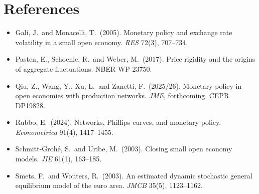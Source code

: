 \documentclass[11pt,a4paper]{article}
\begin{document}
\section*{References}

\begin{itemize}\setlength\itemsep{2pt}
\item[\small\textbullet] Gal\'i, J.\ and Monacelli, T.\ (2005). Monetary policy and exchange rate
  volatility in a small open economy. \textit{RES} 72(3), 707--734. 
\item[\small\textbullet] Pasten, E., Schoenle, R.\ and Weber, M.\ (2017). Price rigidity and the
  origins of aggregate fluctuations. NBER WP 23750. 
\item[\small\textbullet] Qiu, Z., Wang, Y., Xu, L.\ and Zanetti, F.\ (2025/26). Monetary policy in
  open economies with production networks. \textit{JME}, forthcoming. CEPR DP19828.
\item[\small\textbullet] Rubbo, E.\ (2024). Networks, Phillips curves, and monetary policy.
  \textit{Econometrica} 91(4), 1417--1455. 
\item[\small\textbullet] Schmitt-Groh\'e, S.\ and Uribe, M.\ (2003). Closing small open economy
  models. \textit{JIE} 61(1), 163--185. 
\item[\small\textbullet] Smets, F.\ and Wouters, R.\ (2003). An estimated dynamic stochastic
  general equilibrium model of the euro area. \textit{JMCB} 35(5), 1123--1162.
  
\end{itemize}
\end{document}
